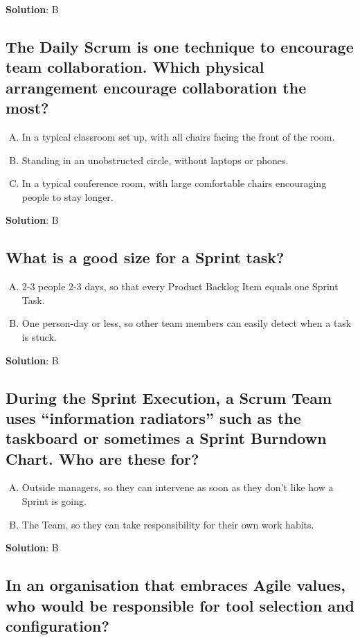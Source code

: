 \textbf{Solution}: B


\subsection{The Daily Scrum is one technique to encourage team collaboration. Which physical arrangement encourage collaboration the most?}
\begin{enumerate}[A)]
  \item In a typical classroom set up, with all chairs facing the front of the room.
  \item Standing in an unobstructed circle, without laptops or phones.
  \item In a typical conference room, with large comfortable chairs encouraging people to stay longer.
\end{enumerate}


\textbf{Solution}: B


\subsection{What is a good size for a Sprint task?}
\begin{enumerate}[A)]
  \item 2-3 people 2-3 days, so that every Product Backlog Item equals one Sprint Task.
  \item One person-day or less, so other team members can easily detect when a task is stuck.
\end{enumerate}


\textbf{Solution}: B


\subsection{During the Sprint Execution, a Scrum Team uses \enquote{information radiators} such as the taskboard or sometimes a Sprint Burndown Chart. Who are these for?}
\begin{enumerate}[A)]
  \item Outside managers, so they can intervene as soon as they don't like how a Sprint is going.
  \item The Team, so they can take responsibility for their own work habits.
\end{enumerate}


\textbf{Solution}: B


\subsection{In an organisation that embraces Agile values, who would be responsible for tool selection and configuration?}


